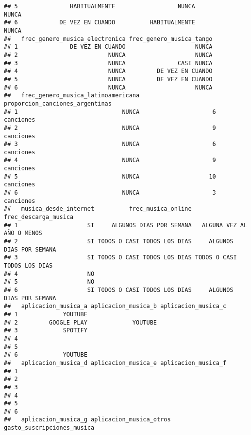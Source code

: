 \documentclass[
]{article}
\begin{document}
\begin{verbatim}
## 5               HABITUALMENTE                  NUNCA                     NUNCA
## 6            DE VEZ EN CUANDO          HABITUALMENTE                     NUNCA
##   frec_genero_musica_electronica frec_genero_musica_tango
## 1               DE VEZ EN CUANDO                    NUNCA
## 2                          NUNCA                    NUNCA
## 3                          NUNCA               CASI NUNCA
## 4                          NUNCA         DE VEZ EN CUANDO
## 5                          NUNCA         DE VEZ EN CUANDO
## 6                          NUNCA                    NUNCA
##   frec_genero_musica_latinoamericana proporcion_canciones_argentinas
## 1                              NUNCA                     6 canciones
## 2                              NUNCA                     9 canciones
## 3                              NUNCA                     6 canciones
## 4                              NUNCA                     9 canciones
## 5                              NUNCA                    10 canciones
## 6                              NUNCA                     3 canciones
##   musica_desde_internet          frec_musica_online        frec_descarga_musica
## 1                    SI     ALGUNOS DIAS POR SEMANA   ALGUNA VEZ AL AÑO O MENOS
## 2                    SI TODOS O CASI TODOS LOS DIAS     ALGUNOS DIAS POR SEMANA
## 3                    SI TODOS O CASI TODOS LOS DIAS TODOS O CASI TODOS LOS DIAS
## 4                    NO                                                        
## 5                    NO                                                        
## 6                    SI TODOS O CASI TODOS LOS DIAS     ALGUNOS DIAS POR SEMANA
##   aplicacion_musica_a aplicacion_musica_b aplicacion_musica_c
## 1             YOUTUBE                                        
## 2         GOOGLE PLAY             YOUTUBE                    
## 3             SPOTIFY                                        
## 4                                                            
## 5                                                            
## 6             YOUTUBE                                        
##   aplicacion_musica_d aplicacion_musica_e aplicacion_musica_f
## 1                                                            
## 2                                                            
## 3                                                            
## 4                                                            
## 5                                                            
## 6                                                            
##   aplicacion_musica_g aplicacion_musica_otros gasto_suscripciones_musica

\end{verbatim}
\end{document}
